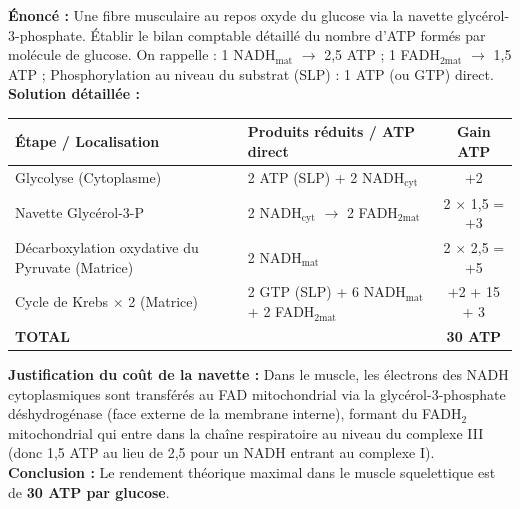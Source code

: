 \documentclass[11pt]{article}
\begin{document}
\begin{exoresolu}
    \textbf{Énoncé :} Une fibre musculaire au repos oxyde du glucose via la navette glycérol-3-phosphate. Établir le bilan comptable détaillé du nombre d'ATP formés par molécule de glucose. On rappelle : 1 NADH$_{\text{mat}}$ $\to$ 2,5 ATP ; 1 FADH$_{2\text{mat}}$ $\to$ 1,5 ATP ; Phosphorylation au niveau du substrat (SLP) : 1 ATP (ou GTP) direct.
    \tcblower
    \textbf{Solution détaillée :}
    \begin{center}
        \begin{tabularx}{\linewidth}{|l|X|c|}\hline
        \textbf{Étape / Localisation} & \textbf{Produits réduits / ATP direct} & \textbf{Gain ATP} \\ \hline
        Glycolyse (Cytoplasme) & 2 ATP (SLP) + 2 NADH$_{\text{cyt}}$ & +2 \\
        Navette Glycérol-3-P & 2 NADH$_{\text{cyt}}$ $\to$ 2 FADH$_{2\text{mat}}$ & 2 $\times$ 1,5 = +3 \\
        Décarboxylation oxydative du Pyruvate (Matrice) & 2 NADH$_{\text{mat}}$ & 2 $\times$ 2,5 = +5 \\
        Cycle de Krebs $\times$ 2 (Matrice) & 2 GTP (SLP) + 6 NADH$_{\text{mat}}$ + 2 FADH$_{2\text{mat}}$ & +2 + 15 + 3 \\ \hline
        \textbf{TOTAL} & & \textbf{30 ATP} \\ \hline
        \end{tabularx}
    \end{center}
    \textbf{Justification du coût de la navette :} Dans le muscle, les électrons des NADH cytoplasmiques sont transférés au FAD mitochondrial via la glycérol-3-phosphate déshydrogénase (face externe de la membrane interne), formant du FADH$_2$ mitochondrial qui entre dans la chaîne respiratoire au niveau du complexe III (donc 1,5 ATP au lieu de 2,5 pour un NADH entrant au complexe I).
    \textbf{Conclusion :} Le rendement théorique maximal dans le muscle squelettique est de \textbf{30 ATP par glucose}.
\end{exoresolu}
\end{document}

